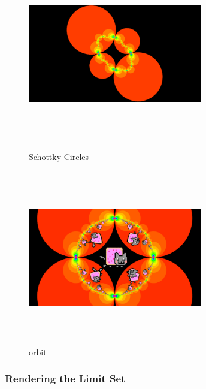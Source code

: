 \begin{figure}[htbp]
 \begin{minipage}{0.49\hsize}
  \begin{center}
   \includegraphics[width=3in, height=3in, keepaspectratio]{../img/klein/schottkyCircles.pdf}
   \caption{Schottky Circles}
   \label{fig:schottky}
  \end{center}
 \end{minipage}
 \begin{minipage}{0.49\hsize}
  \begin{center}
   \includegraphics[width=3in, height=3in, keepaspectratio]{../img/klein/circleOrbit.pdf}
   \caption{orbit}
   \label{fig:orbit}
  \end{center}
 \end{minipage}
\end{figure}


\subsubsection{Rendering the Limit Set}

